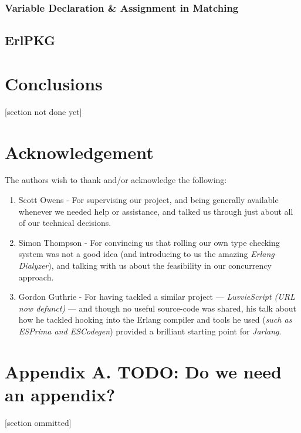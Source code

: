 \documentclass[twoside,12pt,titlepage,a4paper]{article}
\begin{document}
\subsubsection{Variable Declaration \& Assignment in Matching}
\subsection{ErlPKG}

\section{Conclusions}
\label{Conclusions}

 [section not done yet]

\section{Acknowledgement}
	The authors wish to thank and/or acknowledge the following:
	\begin{enumerate}
		\item Scott Owens - For supervising our project, and being generally available whenever we needed help or assistance, and talked us through just about all of our technical decisions.
		\item Simon Thompson - For convincing us that rolling our own type checking system was not a good idea (and introducing to us the amazing \textit{Erlang Dialyzer}), and talking with us about the feasibility in our concurrency approach.
		\item Gordon Guthrie - For having tackled a similar project --- \textit{LuvvieScript (URL now defunct)} --- and though no useful source-code was shared, his talk about how he tackled hooking into the Erlang compiler and tools he used (\textit{such as ESPrima and ESCodegen}) provided a brilliant starting point for \textit{Jarlang}.
	\end{enumerate}
\appendix
\section*{Appendix A. TODO: Do we need an appendix?}


[section ommitted]



\vskip 0.2in


\end{document}
